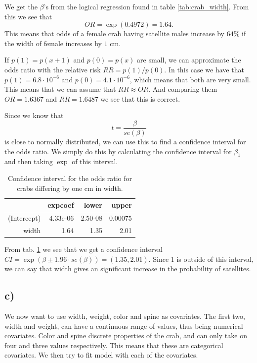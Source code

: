 \documentclass[a4paper,norsk, 10pt]{article}
\begin{document}
We get the $\beta$'s from the logical regression found in table \ref{tab:crab_width}. From this we see that 
\begin{equation}
OR = \exp(0.4972) = 1.64.
\end{equation}
This means that odds of a female crab having satellite males increase by $64\%$ if the width of female increases by $1$ cm.

If $p(1) = p(x+1)$ and $p(0)=p(x)$ are small, we can approximate the odds ratio with the relative risk $RR = p(1)/p(0)$. In this case we have that $p(1) = 6.8\cdot 10^{-6}$ and $p(0) = 4.1 \cdot 10^{-6}$, which means that both are very small. This means that we can assume that $RR \approx OR$. And comparing them $OR = 1.6367$ and $RR = 1.6487$ we see that this is correct.

Since we know that 
\begin{equation}
t = \frac{\beta}{se(\beta)}
\end{equation}
is close to normally distributed, we can use this to find a confidence interval for the odds ratio. We simply do this by calculating the confidence interval for $\beta_1$ and then taking $\exp$ of this interval. 

\begin{table}[!ht]
\centering
\begin{tabular}{rrrr}
  \hline
 & expcoef & lower & upper \\ 
  \hline
(Intercept) & 4.33e-06 & 2.50-08 & 0.00075 \\ 
  width & 1.64 & 1.35 & 2.01 \\ 
   \hline
\end{tabular}
\caption{Confidence interval for the odds ratio for crabs differing by one cm in width.}\label{tab:crabs_OR_CI}
\end{table}

From tab. \ref{tab:crabs_OR_CI} we see that we get a confidence interval $CI = \exp(\beta \pm 1.96\cdot se(\beta)) = (1.35,2.01)$. Since $1$ is outside of this interval, we can say that width gives an significant increase in the probability of satellites. 

\subsection{c)}
We now want to use width, weight, color and spine as covariates. The first two, width and weight, can have a continuous range of values, thus being numerical covariates. Color and spine discrete properties of the crab, and can only take on four and three values respectively. This means that these are categorical covariates. We then try to fit model with each of the covariates.
\end{document}
